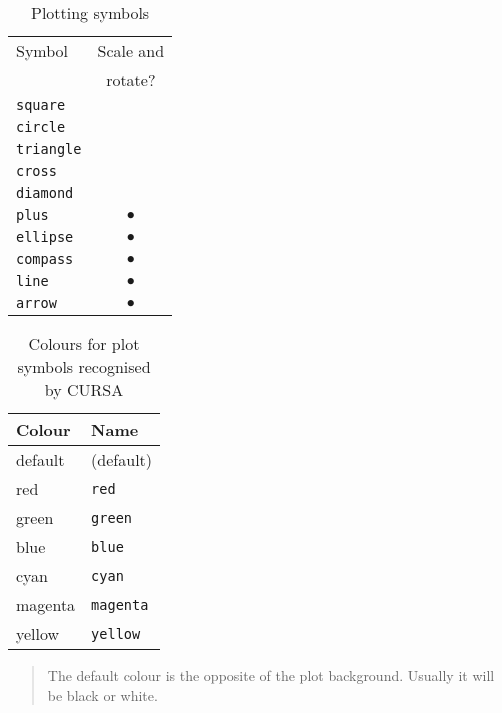 \documentclass[twoside,11pt,nolof,chapters]{starlink}
\begin{document}
\pagebreak
\begin{table}
\begin{center}
\begin{tabular}{lc}
Symbol & Scale and \\
       & rotate?   \\ \hline
\texttt{square}   &   \\
\texttt{circle}   &   \\
\texttt{triangle} &   \\
\texttt{cross}    &   \\
\texttt{diamond}  &   \\
\texttt{plus}     &  $\bullet$ \\
\texttt{ellipse}  &  $\bullet$ \\
\texttt{compass}  &  $\bullet$ \\
\texttt{line}     &  $\bullet$ \\
\texttt{arrow}    &  $\bullet$ \\
\end{tabular}
\end{center}

\begin{center}
\caption{Plotting symbols \label{PLOTTING_SYMBOLS} }
\end{center}

\end{table}

\begin{table}[htbp]

\begin{center}
\begin{tabular}{ll}
Colour   & Name \\ \hline
default  & (default)      \\
red      & \texttt{red}      \\
green    & \texttt{green}    \\
blue     & \texttt{blue}     \\
cyan     & \texttt{cyan}     \\
magenta  & \texttt{magenta}  \\
yellow   & \texttt{yellow}   \\
\end{tabular}
\end{center}

\begin{quote}
The default colour is the opposite of the plot background.  Usually
it will be black or white.
\end{quote}

\begin{center}
\caption{Colours for plot symbols recognised by CURSA \label{CURSA_COLOURS} }
\end{center}

\end{table}
\end{document}
